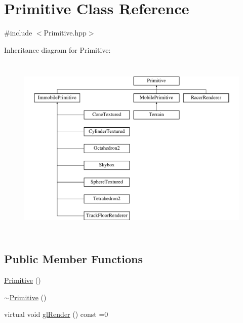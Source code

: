 \hypertarget{class_primitive}{\section{Primitive Class Reference}
\label{class_primitive}
}


{\ttfamily \#include $<$Primitive.\-hpp$>$}

Inheritance diagram for Primitive\-:\begin{figure}[H]
\begin{center}
\leavevmode
\includegraphics[height=9.000000cm]{class_primitive}
\end{center}
\end{figure}
\subsection*{Public Member Functions}
\begin{DoxyCompactItemize}
\item 
\hyperlink{class_primitive_ae6b6e9440d482575d1dcbf77a936c201}{Primitive} ()
\item 
\hyperlink{class_primitive_ad128050320901807bfe5fc20b4331db6}{$\sim$\-Primitive} ()
\item 
virtual void \hyperlink{class_primitive_aef765029fae092f0f6dd1507e18e72e0}{gl\-Render} () const =0
\end{DoxyCompactItemize}
